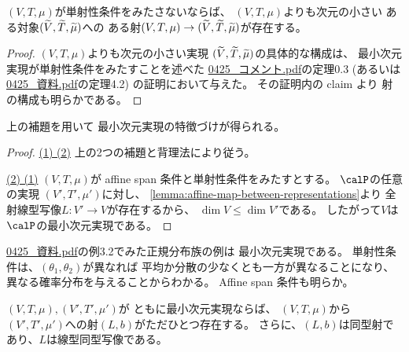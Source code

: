 \documentclass[report]{jlreq}
\begin{document}
\begin{lemma}
    $(V, T, \mu)$が単射性条件をみたさないならば、
    $(V, T, \mu)$よりも次元の小さい
    ある対象$(\widetilde{V}, \widetilde{T}, \widetilde{\mu})$への
    ある射$(V, T, \mu) \to (\widetilde{V}, \widetilde{T}, \widetilde{\mu})$が存在する。
\end{lemma}

\begin{proof}
    $(V, T, \mu)$よりも次元の小さい実現
    $(\widetilde{V}, \widetilde{T}, \widetilde{\mu})$の具体的な構成は、
    最小次元実現が単射性条件をみたすことを述べた
    \url{0425_コメント.pdf}の定理0.3
    (あるいは\url{0425_資料.pdf}の定理4.2)
    の証明において与えた。
    その証明内の claim より
    射の構成も明らかである。
\end{proof}

上の補題を用いて
最小次元実現の特徴づけが得られる。


\begin{proof}
    \uline{(1) \Rightarrow (2)} \quad
    上の2つの補題と背理法により従う。

    \uline{(2) \Rightarrow (1)} \quad
    $(V, T, \mu)$が affine span 条件と単射性条件をみたすとする。
    $\calP$の任意の実現
    $(V', T', \mu')$に対し、
    \cref{lemma:affine-map-between-representations}より
    全射線型写像$L: V' \to V$が存在するから、
    $\dim V \le \dim V'$である。
    したがって$V$は$\calP$の最小次元実現である。
\end{proof}

\begin{remark}[正規分布族の最小次元実現]
    \url{0425_資料.pdf}の例3.2でみた正規分布族の例は
    最小次元実現である。
    単射性条件は、$(\theta_1, \theta_2)$が異なれば
    平均か分散の少なくとも一方が異なることになり、
    異なる確率分布を与えることからわかる。
    Affine span 条件も明らか。
\end{remark}

\begin{theorem}[最小次元実現の間のアファイン変換]
    $(V, T, \mu), (V', T', \mu')$が
    ともに最小次元実現ならば、
    $(V, T, \mu)$から$(V', T', \mu')$への射$(L, b)$がただひとつ存在する。
    さらに、$(L, b)$は同型射であり、$L$は線型同型写像である。
\end{theorem}
\end{document}
